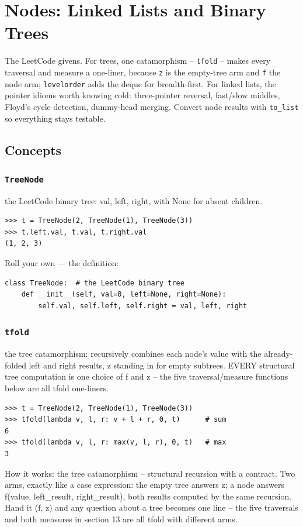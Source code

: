 \documentclass[10pt,letterpaper]{book}
\begin{document}
\chapter{Nodes: Linked Lists and Binary Trees}

The LeetCode givens. For trees, one catamorphism -- \texttt{tfold} -- makes
every traversal and measure a one-liner, because \texttt{z} is the
empty-tree arm and \texttt{f} the node arm; \texttt{levelorder} adds the
deque for breadth-first. For linked lists, the pointer idioms worth knowing
cold: three-pointer reversal, fast/slow middles, Floyd's cycle detection,
dummy-head merging. Convert node results with \texttt{to\_list} so
everything stays testable.
\section{Concepts}
\subsection{\texttt{TreeNode}}\label{def:TreeNode}
the LeetCode binary tree: val, left, right, with None for absent children.
\begin{lstlisting}[style=ex]
>>> t = TreeNode(2, TreeNode(1), TreeNode(3))
>>> t.left.val, t.val, t.right.val
(1, 2, 3)
\end{lstlisting}

Roll your own --- the definition:

\begin{lstlisting}[style=ex]
class TreeNode:  # the LeetCode binary tree
    def __init__(self, val=0, left=None, right=None):
        self.val, self.left, self.right = val, left, right
\end{lstlisting}
\subsection{\texttt{tfold}}\label{def:tfold}
the tree catamorphism: recursively combines each node's value with the already-folded left and right results, z standing in for empty subtrees. EVERY structural tree computation is one choice of f and z -- the five traversal/measure functions below are all tfold one-liners.
\begin{lstlisting}[style=ex]
>>> t = TreeNode(2, TreeNode(1), TreeNode(3))
>>> tfold(lambda v, l, r: v + l + r, 0, t)      # sum
6
>>> tfold(lambda v, l, r: max(v, l, r), 0, t)   # max
3
\end{lstlisting}

How it works: the tree catamorphism -- structural recursion with a contract. Two arms, exactly like a case expression: the empty tree answers z; a node answers f(value, left\_result, right\_result), both results computed by the same recursion. Hand it (f, z) and any question about a tree becomes one line -- the five traversals and both measures in section 13 are all tfold with different arms.
\end{document}
